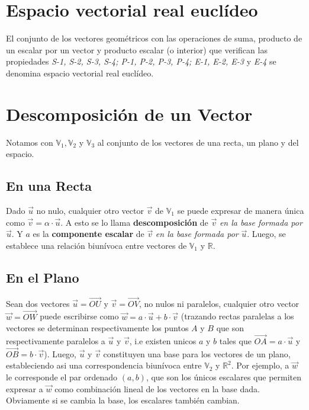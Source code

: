 \documentclass[11pt,a4paper]{article}
\begin{document}
\section{Espacio vectorial real eucl\'ideo}
El conjunto de los vectores geom\'etricos con las operaciones de suma, producto de un escalar por un vector y producto escalar (o interior) que verifican las propiedades \textit{S-1, S-2, S-3, S-4; P-1, P-2, P-3, P-4; E-1, E-2, E-3} y \textit{E-4} se denomina espacio vectorial real eucl\'ideo.

\section{Descomposici\'on de un Vector}
\noindent Notamos con $\mathbb{V}_1,\mathbb{V}_2$ y $\mathbb{V}_3$ al conjunto de los vectores de una recta, un plano y del espacio.
\subsection{En una Recta}
\noindent Dado $\overrightarrow{u}$ no nulo, cualquier otro vector $\overrightarrow{v}$ de $\mathbb{V}_1$ se puede expresar de manera \'unica como $\overrightarrow{v} = \alpha \cdot \overrightarrow{u}$. A esto se lo llama \textbf{descomposici\'on} de $\overrightarrow{v}$ \textit{en la base formada por} $\overrightarrow{u}$. Y $a$ es la \textbf{componente escalar} de $ \overrightarrow{v}$ \textit{en la base formada por} $\overrightarrow{u}$. Luego, se establece una relaci\'on biun\'ivoca entre vectores de $\mathbb{V}_1$ y $\mathbb{R}$.
\subsection{En el Plano}
\noindent Sean dos vectores $\overrightarrow{u} = \overrightarrow{OU}$ y $\overrightarrow{v} = \overrightarrow{OV}$, no nulos ni paralelos, cualquier otro vector $\overrightarrow{w} = \overrightarrow{OW}$ puede escribirse como $\overrightarrow{w} = a \cdot \overrightarrow{u} + b \cdot \overrightarrow{v}$ (trazando rectas paralelas a los vectores se determinan respectivamente los puntos $A$ y $B$ que son respectivamente paralelos a $\overrightarrow{u}$ y $\overrightarrow{v}$, i.e existen unicos $a$ y $b$ tales que $\overrightarrow{OA} = a \cdot \overrightarrow{u}$ y $\overrightarrow{OB} = b \cdot \overrightarrow{v}$). Luego, $\overrightarrow{u}$ y $\overrightarrow{v}$ constituyen una base para los vectores de un plano, estableciendo asi una correspondencia biun\'ivoca entre $\mathbb{V}_2$ y $\mathbb{R}^2$. Por ejemplo, a $\overrightarrow{w}$ le corresponde el par ordenado $(a,b)$, que son los \'unicos escalares que permiten expresar a $\overrightarrow{w}$ como combinaci\'on lineal de los vectores en la base dada. Obviamente si se cambia la base, los escalares tambi\'en cambian.\\
\end{document}
